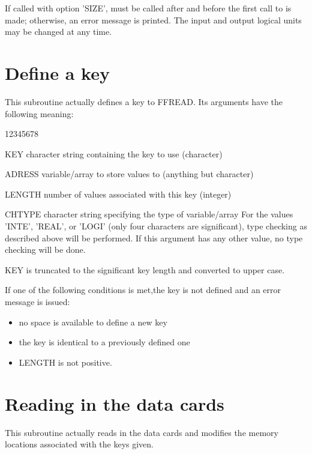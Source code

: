 If called with option 'SIZE',  must be called after  and before
the first call to  is made; otherwise, an error message is printed.
The input and output logical units may be changed at any time.
 
\newpage
\section{Define a key}
 
 
This subroutine actually defines a key to FFREAD. Its arguments have the
following meaning:
 
\begin{DLtt}{12345678}
\item[KEY]character string containing the key to use (character)
\item[ADRESS]variable/array to store values to (anything but character)
\item[LENGTH]number of values associated with this key (integer)
\item[CHTYPE]character string specifying the type of variable/array
For the values 'INTE', 'REAL', or 'LOGI' (only four characters
are significant), type checking as described above will be performed.
If this argument has any other value, no type checking will be done.
\end{DLtt}
 
KEY is truncated to the significant key length and converted to upper case.
 
If one of the following conditions is met,the key is not defined and
an error message is issued:
 
\begin{itemize}
\item
no space is available to define a new key
\item
the key is identical to a previously defined one
\item
LENGTH is not positive.
\end{itemize}
 
\section{Reading in the data cards}
 
 
This subroutine actually reads in the data cards and modifies the memory
locations associated with the keys given.
 
